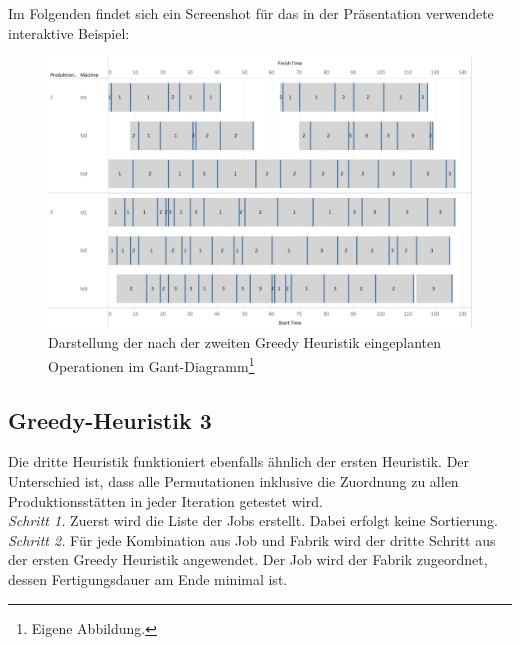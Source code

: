\documentclass[final, english, ngerman, a4paper, 12pt, %
numbers=noenddot,
cd=true,
cdfont=false,cdfont=nohead,cdfont=nodin,
cdmath=false,
cdhead=false,
cdfoot=true,
cdcover=monochrome,
cdgeometry=symmetric,
declaration=heading,
declaration=notoc,
abstract=heading,
]{tudscrreprt}
\begin{document}
\noindent
Im Folgenden findet sich ein Screenshot für das in der Präsentation verwendete interaktive Beispiel:
\begin{figure}[H]
	\centering
	\includegraphics[width=\textwidth]{./settings/gh2}
	\caption[Interaktives Beispiel - Einplanung nach der zweiten Greedy Heuristik]{Darstellung der nach der zweiten Greedy Heuristik eingeplanten Operationen im Gant-Diagramm\footnote{Eigene Abbildung.}}\label{fig:gh2}
\end{figure}

\subsection{Greedy-Heuristik 3}
Die dritte Heuristik funktioniert ebenfalls ähnlich der ersten Heuristik. Der Unterschied ist, dass alle Permutationen inklusive die Zuordnung zu allen Produktionsstätten in jeder Iteration getestet wird.\\

\noindent
\textit{Schritt 1.}  Zuerst wird die Liste der Jobs erstellt. Dabei erfolgt keine Sortierung.\\

\noindent
\textit{Schritt 2.} Für jede Kombination aus Job und Fabrik wird der dritte Schritt aus der ersten Greedy Heuristik angewendet. Der Job wird der Fabrik zugeordnet, dessen Fertigungsdauer am Ende minimal ist. \\
\end{document}
